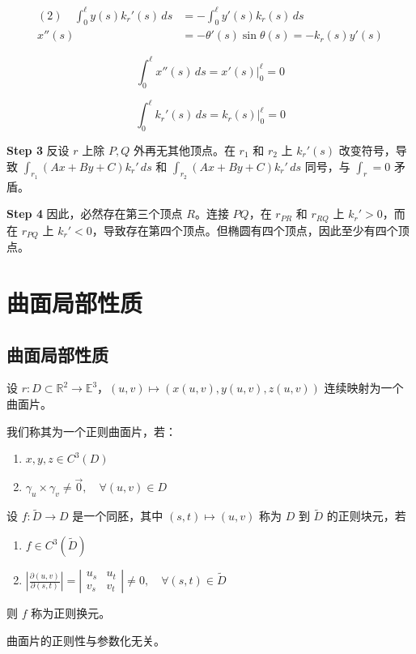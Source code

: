 \documentclass[lang=cn,10pt,thmcnt=section]{elegantbook}
\begin{document}
    \begin{align*}
    (2) \quad \int_0^{\ell} y(s) k_r'(s) \, ds &= -\int_0^{\ell} y'(s) k_r(s) \, ds \\
    x''(s) &= -\theta'(s) \sin \theta(s) = -k_r(s) y'(s)
    \end{align*}
    
    $$
    \int_0^{\ell} x''(s) \, ds = \left. x'(s) \right|_0^{\ell} = 0
    $$
    
    $$
    \int_0^{\ell} k_r'(s) \, ds = \left. k_r(s) \right|_0^{\ell} = 0
    $$
    
    \textbf{Step 3} 反设 $r$ 上除 $P, Q$ 外再无其他顶点。在 $r_1$ 和 $r_2$ 上 $k_r'(s)$ 改变符号，导致 $\int_{r_1} (Ax + By + C) k_r' \, ds$ 和 $\int_{r_2} (Ax + By + C) k_r' \, ds$ 同号，与 $\int_r = 0$ 矛盾。
    
    \textbf{Step 4} 因此，必然存在第三个顶点 $R$。连接 $PQ$，在 $r_{PR}$ 和 $r_{RQ}$ 上 $k_r' > 0$，而在 $r_{PQ}$ 上 $k_r' < 0$，导致存在第四个顶点。但椭圆有四个顶点，因此至少有四个顶点。

\chapter{曲面局部性质}
\section{曲面局部性质}
\begin{definition}[正则曲面片]
    设 $r: D \subset \mathbb{R}^2 \rightarrow \mathbb{E}^3$，$(u,v) \mapsto (x(u,v), y(u,v), z(u,v))$ 连续映射为一个曲面片。
    
    我们称其为一个正则曲面片，若：
    \begin{enumerate}
        \item $x, y, z \in C^3(D)$
        \item $\gamma_u \times \gamma_v \neq \vec{0}, \quad \forall (u,v) \in D$
    \end{enumerate}
    \end{definition}
\begin{definition}[正则换元]
        设 $f: \widetilde{D} \rightarrow D$ 是一个同胚，其中 $(s,t) \mapsto (u,v)$ 称为 $D$ 到 $\widetilde{D}$ 的正则块元，若
        \begin{enumerate}
            \item $f \in C^3(\widetilde{D})$
            \item $\left| \frac{\partial (u,v)}{\partial (s,t)} \right| = \left| \begin{matrix} u_s & u_t \\ v_s & v_t \end{matrix} \right| \neq 0, \quad \forall (s,t) \in \widetilde{D}$
        \end{enumerate}
        则 $f$ 称为正则换元。
\end{definition}  
\begin{proposition}
    曲面片的正则性与参数化无关。
    \end{proposition}
    
\end{document}
